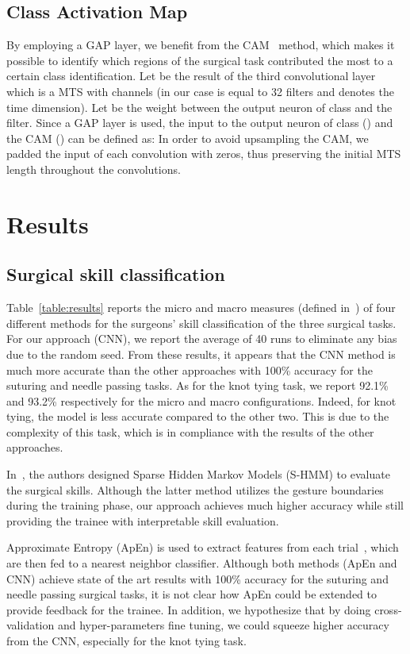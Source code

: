 \documentclass{llncs}
\begin{document}
\subsection{Class Activation Map}\label{sec:cam}
By employing a GAP layer, we benefit from the CAM~\cite{zhou2016learning} method, which makes it possible to identify which regions of the surgical task contributed the most to a certain class identification. 
Let  be the result of the third convolutional layer which is a MTS with  channels (in our case  is equal to 32 filters and  denotes the time dimension). 
Let  be the weight between the output neuron of class  and the  filter. 
Since a GAP layer is used, the input to the output neuron of class  () and the CAM () can be defined as:
In order to avoid upsampling the CAM, we padded the input of each convolution with zeros, thus preserving the initial MTS length  throughout the convolutions. 

\section{Results}
\subsection{Surgical skill classification}
Table~\ref{table:results} reports the micro and macro measures (defined in~\cite{ahmidi2017a}) of four different methods for the surgeons' skill classification of the three surgical tasks. 
For our approach (CNN), we report the average of 40 runs to eliminate any bias due to the random seed. 
From these results, it appears that the CNN method is much more accurate than the other approaches with 100\% accuracy for the suturing and needle passing tasks.
As for the knot tying task, we report 92.1\% and 93.2\% respectively for the micro and macro configurations. 
Indeed, for knot tying, the model is less accurate compared to the other two.
This is due to the complexity of this task, which is in compliance with the results of the other approaches.  

In~\cite{lingling2012sparse}, the authors designed Sparse Hidden Markov Models (S-HMM) to evaluate the surgical skills. 
Although the latter method utilizes the gesture boundaries during the training phase, our approach achieves much higher accuracy while still providing the trainee with interpretable skill evaluation. 

Approximate Entropy (ApEn) is used to extract features from each trial~\cite{zia2017automated}, which are then fed to a nearest neighbor classifier. 
Although both methods (ApEn and CNN) achieve state of the art results with 100\% accuracy for the suturing and needle passing surgical tasks, it is not clear how ApEn could be extended to provide feedback for the trainee. 
In addition, we hypothesize that by doing cross-validation and hyper-parameters fine tuning, we could squeeze higher accuracy from the CNN, especially for the knot tying task.
\end{document}
